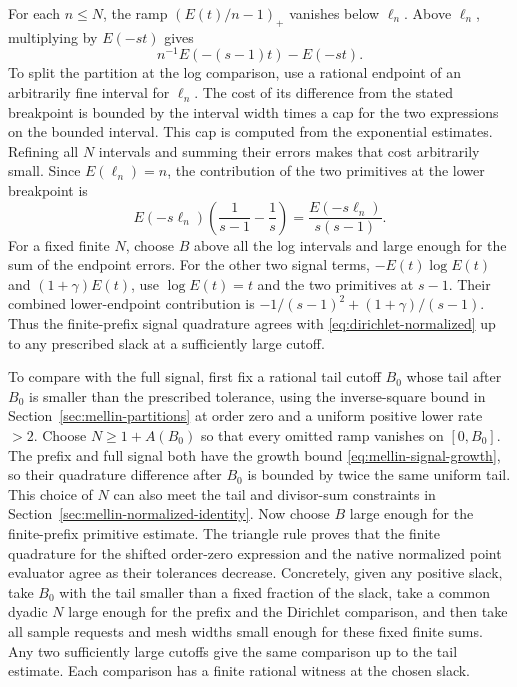 \documentclass[11pt]{amsart}
\theoremstyle{definition}
\theoremstyle{remark}
\numberwithin{equation}{section}
\begin{document}
For each \(n\le N\), the ramp
\((E(t)/n-1)_+\) vanishes below \(\ell_n\).
Above \(\ell_n\), multiplying by \(E(-st)\) gives
\[
                    n^{-1}E(-(s-1)t)-E(-st).
\]
To split the partition at the log comparison, use a
rational endpoint of an arbitrarily fine interval for
\(\ell_n\). The cost of its difference from the stated
breakpoint is bounded by the interval width times a
cap for the two expressions on the bounded interval.
This cap is computed from the exponential estimates.
Refining all \(N\) intervals and summing their errors
makes that cost arbitrarily small. Since
\(E(\ell_n)=n\), the contribution of the two primitives
at the lower breakpoint is
\[
                   E(-s\ell_n)
                          \left(\frac1{s-1}-\frac1s\right)
                     =\frac{E(-s\ell_n)}{s(s-1)} .
\]
For a fixed finite \(N\), choose \(B\) above all the log
intervals and large enough for the sum of the endpoint
errors. For the other two signal terms,
\(-E(t)\log E(t)\) and \((1+\gamma)E(t)\),
use \(\log E(t)=t\) and the two primitives at \(s-1\).
Their combined lower-endpoint contribution is
\(-1/(s-1)^2+(1+\gamma)/(s-1)\).
Thus the finite-prefix signal quadrature agrees with
\eqref{eq:dirichlet-normalized} up to any prescribed slack
at a sufficiently large cutoff.

To compare with the full signal, first fix a rational
tail cutoff \(B_0\) whose tail after \(B_0\) is smaller
than the prescribed tolerance, using the inverse-square
bound in Section~\ref{sec:mellin-partitions} at order
zero and a uniform positive lower rate \(>2\).
Choose \(N\ge 1+A(B_0)\) so that every omitted ramp
vanishes on \([0,B_0]\). The prefix and full signal
both have the growth bound \eqref{eq:mellin-signal-growth},
so their quadrature difference after \(B_0\) is bounded
by twice the same uniform tail. This choice of \(N\)
can also meet the tail and divisor-sum constraints in
Section~\ref{sec:mellin-normalized-identity}.
Now choose \(B\) large enough for the finite-prefix
primitive estimate. The triangle rule proves that
the finite quadrature for the shifted order-zero
expression and the native normalized point evaluator
agree as their tolerances decrease. Concretely, given
any positive slack, take \(B_0\) with the tail smaller
than a fixed fraction of the slack, take a common
dyadic \(N\) large enough for the prefix and the
Dirichlet comparison, and then take all sample
requests and mesh widths small enough for these fixed
finite sums. Any two sufficiently large cutoffs give
the same comparison up to the tail estimate.
Each comparison has a finite rational witness at the chosen slack.
\end{document}
